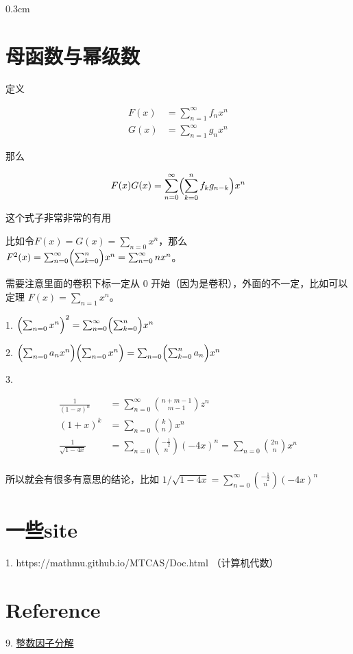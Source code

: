 \documentclass{article}
\newcommand{\setParDis}{\setlength {\parskip} {0.3cm} }
\newcommand{\nident}{\setlength{\parindent}{0pt}}
\begin{document}
\setParDis

\section{母函数与幂级数}

定义 

\begin{equation}
    \begin{aligned}
        F(x)&=\sum_{n=1}^{\infty}f_nx^n\\
        G(x)&=\sum_{n=1}^{\infty}g_nx^n
    \end{aligned}
\end{equation}

那么

\begin{equation}
    F(x)G(x)=\sum_{n=0}^{\infty}\Bigl(\sum_{k=0}^nf_kg_{n-k}\Bigr)x^n
\end{equation}

这个式子非常非常的有用

比如令$F(x)=G(x)=\sum_{n=0}x^n$，那么$F^2(x)=\sum_{n=0}^{\infty}\Bigl(\sum_{k=0}^n\Bigr)x^n=\sum_{n=0}^{\infty}nx^n$。

需要注意里面的卷积下标一定从 0 开始（因为是卷积），外面的不一定，比如可以定理 $F(x)=\sum_{n=1}x^n$。

1. $\Bigl(\sum_{n=0}x^n\Bigr)^2=\sum_{n=0}^{\infty}\Bigl(\sum_{k=0}^n\Bigr)x^n$

2. $\Bigl(\sum_{n=0}a_nx^n\Bigr)\Bigl(\sum_{n=0}x^n\Bigr)=\sum_{n=0}\Bigl(\sum_{k=0}^na_n\Bigr)x^n$

3. 

\begin{equation}
    \begin{aligned}
        \frac{1}{(1-x)^n}&=\sum_{n = 0}^{\infty}\binom{n+m-1}{m-1}z^n\\
        (1+x)^k&=\sum_{n=0}\binom{k}{n}x^n\\
        \frac1{\sqrt{1-4x}}&=\sum_{n=0}\binom{-\frac12}{n}(-4x)^n=\sum_{n=0}\binom{2n}{n}x^n\\
    \end{aligned}
\end{equation}

所以就会有很多有意思的结论，比如 $1/\sqrt{1-4x}=\sum_{n=0}^{\infty}\binom{-\frac12}{n}(-4x)^n$

\section{一些site}

1. https://mathmu.github.io/MTCAS/Doc.html （计算机代数）


\section{Reference}


9. \href{https://mathmu.github.io/MTCAS/doc/IntegerFactorization.html#sec8}{整数因子分解}
\end{document}
